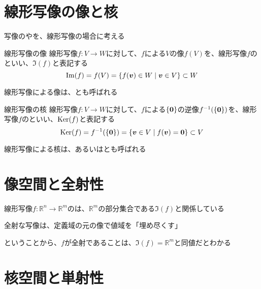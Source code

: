 \documentclass[../../../topic_linear-algebra]{subfiles}
\begin{document}
\sectionline
\section{線形写像の像と核}

写像のやを、線形写像の場合に考える

\begin{definition}{線形写像の像}
  線形写像$f\colon V \to W$に対して、$f$による$V$の像$f(V)$を、線形写像$f$のといい、$\Im(f)$と表記する
  \begin{equation*}
    \Im(f) = f(V) = \{ f(\vb*{v}) \in W \mid \vb*{v} \in V \} \subset W
  \end{equation*}
\end{definition}

線形写像による像は、とも呼ばれる

\br

\begin{definition}{線形写像の核}
  線形写像$f\colon V \to W$に対して、$f$による$\{\vb*{0}\}$の逆像$f^{-1}(\{\vb*{0}\})$を、線形写像$f$のといい、$\operatorname{Ker}(f)$と表記する
  \begin{equation*}
    \operatorname{Ker}(f) = f^{-1}(\{\vb*{0}\}) = \{ \vb*{v} \in V \mid f(\vb*{v}) = \vb*{0} \} \subset V
  \end{equation*}
\end{definition}

線形写像による核は、あるいはとも呼ばれる

\sectionline
\section{像空間と全射性}

線形写像$f\colon \mathbb{R}^n \to \mathbb{R}^m$のは、$\mathbb{R}^m$の部分集合である$\Im(f)$と関係している

\begin{shaded}
  全射な写像は、定義域の元の像で値域を「埋め尽くす」
\end{shaded}

ということから、$f$が全射であることは、$\Im(f) = \mathbb{R}^m$と同値だとわかる

\sectionline
\section{核空間と単射性}
\end{document}
